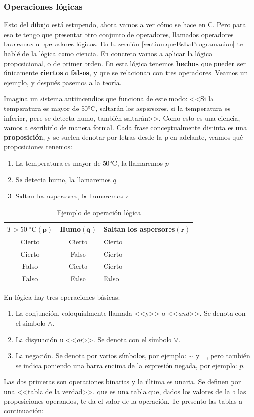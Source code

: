 \documentclass[a4paper]{article}
\newcommand{\centigrade}{°C}
\begin{document}
\subsubsection{Operaciones lógicas}
Esto del dibujo está estupendo, ahora vamos a ver cómo se hace en C. Pero para
eso te tengo que presentar otro conjunto de operadores, llamados
operadores booleanos u operadores lógicos. En la sección
\ref{section:queEsLaProgramacion} te hablé de la lógica como ciencia.
En concreto vamos a
aplicar la lógica proposicional, o de primer orden. En esta lógica tenemos
\textbf{hechos} que pueden ser únicamente \textbf{ciertos} o \textbf{falsos},
y que se relacionan con tres operadores. Veamos un ejemplo, y después pasemos
a la teoría.

Imagina un sistema antiincendios que funciona de este modo: <<Si la temperatura
es mayor de 50\centigrade, saltarán los aspersores, si la temperatura es inferior,
pero se detecta humo, también saltarán>>.
Como esto es una ciencia, vamos a escribirlo de manera formal. Cada frase
conceptualmente distinta es una \textbf{proposición}, y se suelen denotar por
letras desde la p en adelante, veamos qué proposiciones tenemos:
\begin{enumerate}
\item La temperatura es mayor de 50\centigrade, la llamaremos $p$
\item Se detecta humo, la llamaremos $q$
\item Saltan los aspersores, la llamaremos $r$
\end{enumerate}



\begin{table}[H]
\begin{tabularx}{\linewidth}{|c|c|Y|}
\hline
$T>50\;{}^{\circ}\mathrm{C}(\mathbf{p})$&Humo$(\mathbf{q})$&Saltan los aspersores$(\mathbf{r})$\\\hline
Cierto& Cierto & Cierto \\\hline
Cierto& Falso  & Cierto \\\hline
Falso & Cierto & Cierto \\\hline
Falso & Falso  & Falso  \\\hline
\end{tabularx}
\caption{Ejemplo de operación lógica}
\label{tab:logicOperationExample}%
\end{table}

En lógica hay tres operaciones básicas:
\begin{enumerate}
\item La conjunción, coloquialmente llamada <<y>> o <<\textit{and}>>. Se denota
con el símbolo $\wedge$.
\item La disyunción u <<\textit{or}>>. Se denota con el símbolo $\lor$.
\item La negación. Se denota por varios símbolos, por ejemplo: $\sim$ y $\lnot$, pero
también se indica poniendo una barra encima de la expresión negada, por ejemplo:
$\overline{p}$.
\end{enumerate}
Las dos primeras son operaciones binarias y la última es unaria. Se definen
por una <<tabla de la verdad>>, que es una tabla que, dados los valores de la
o las proposiciones operandos, te da el valor de la operación. Te presento las
tablas a continuación:
\end{document}

